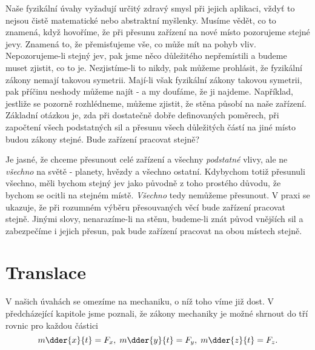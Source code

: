     Naše fyzikální úvahy vyžadují určitý zdravý smysl při jejich aplikaci, vždyť to nejsou čistě 
    matematické nebo abstraktní myšlenky. Musíme vědět, co to znamená, když hovoříme, že při 
    přesunu zařízení na nové místo pozorujeme stejné jevy. Znamená to, že přemisťujeme vše, co může 
    mít na pohyb vliv. Nepozorujeme-li stejný jev, pak jsme něco důležitého nepřemístili a budeme 
    muset zjistit, co to je. Nezjistíme-li to nikdy, pak můžeme prohlásit, že fyzikální zákony 
    nemají takovou symetrii. Mají-li však fyzikální zákony takovou symetrii, pak příčinu neshody 
    můžeme najít - a my doufáme, že ji najdeme. Například, jestliže se pozorně rozhlédneme, můžeme 
    zjistit, že stěna působí na naše zařízení. Základní otázkou je, zda při dostatečně dobře 
    definovaných poměrech, při započtení všech podstatných sil a přesunu všech důležitých částí na 
    jiné místo budou zákony stejné. Bude zařízení pracovat stejně?
    
    Je jasné, že chceme přesunout celé zařízení a všechny \emph{podstatné} vlivy, ale ne 
    \emph{všechno} na světě - planety, hvězdy a všechno ostatní. Kdybychom totiž přesunuli všechno, 
    měli bychom stejný jev jako původně z toho prostého důvodu, že bychom se ocitli na stejném 
    místě. \emph{Všechno} tedy nemůžeme přesunout. V praxi se ukazuje, že při rozumném výběru 
    přesouvaných věcí bude zařízení pracovat stejně. Jinými slovy, nenarazíme-li na stěnu, 
    budeme-li znát původ vnějších sil a zabezpečíme i jejich přesun, pak bude zařízení pracovat na 
    obou místech stejně.
    
  \section{Translace}\label{fyz:IchapXIsecI}
    V našich úvahách se omezíme na mechaniku, o níž toho víme již dost. V předcházející kapitole
    jsme poznali, že zákony mechaniky je možné shrnout do tří rovnic pro každou částici
    \begin{equation}\label{fyz:eq145}
      m\dder{x}{t} = F_x, \;
      m\dder{y}{t} = F_y, \;
      m\dder{z}{t} = F_z.
    \end{equation}

